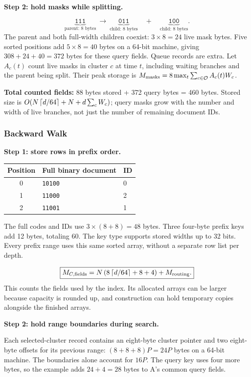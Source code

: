\textbf{Step 2: hold masks while splitting.}\par
\[
 \underbrace{\texttt{111}}_{\text{parent: 8 bytes}}
 \ \longrightarrow\
 \underbrace{\texttt{011}}_{\text{child: 8 bytes}}
 \quad+\quad
 \underbrace{\texttt{100}}_{\text{child: 8 bytes}}.
\]
The parent and both full-width children coexist: $3\times8=24$ live mask bytes. Five sorted positions add $5\times8=40$ bytes on a 64-bit machine, giving $308+24+40=372$ bytes for these query fields. Queue records are extra. Let $A_c(t)$ count live masks in cluster $c$ at time $t$, including waiting branches and the parent being split. Their peak storage is $M_{\rm masks}=8\max_t\sum_{c\in\mathcal O}A_c(t)W_c$.

\textbf{Total counted fields:} 88 bytes stored + 372 query bytes = 460 bytes. Stored size is $O(N\left\lceil d/64\right\rceil+N+d\sum_c W_c)$; query masks grow with the number and width of live branches, not just the number of remaining document IDs.

\subsubsection{Backward Walk}
\textbf{Step 1: store rows in prefix order.}\par
\begin{center}
\begin{tabular}{@{}cll@{}}\toprule
Position & Full binary document & ID\\\midrule
0 & \texttt{10100} & 0\\
1 & \texttt{11000} & 2\\
2 & \texttt{11001} & 1\\\bottomrule
\end{tabular}
\end{center}
The full codes and IDs use $3\times(8+8)=48$ bytes. Three four-byte prefix keys add 12 bytes, totaling 60. The key type supports stored widths up to 32 bits. Every prefix range uses this same sorted array, without a separate row list per depth.

\[
\boxed{M_{C,\rm fields}=N\left(8\left\lceil d/64\right\rceil+8+4\right)+M_{\rm routing}.}
\]
This counts the fields used by the index. Its allocated arrays can be larger because capacity is rounded up, and construction can hold temporary copies alongside the finished arrays.

\textbf{Step 2: hold range boundaries during search.}\par
Each selected-cluster record contains an eight-byte cluster pointer and two eight-byte offsets for its previous range: $(8+8+8)P=24P$ bytes on a 64-bit machine. The boundaries alone account for $16P$. The query key uses four more bytes, so the example adds $24+4=28$ bytes to A's common query fields.

